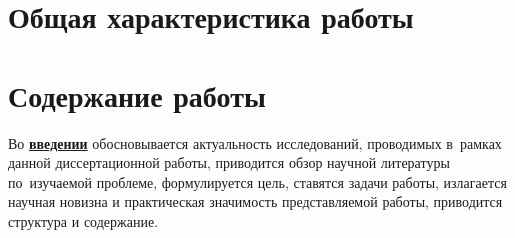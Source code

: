 \section*{Общая характеристика работы}

\newcommand{\actuality}{\pdfbookmark[1]{Актуальность}{actuality}\underline{\textbf{\actualityTXT}}}
\newcommand{\progress}{\pdfbookmark[1]{Разработанность темы}{progress}\underline{\textbf{\progressTXT}}}
\newcommand{\aim}{\pdfbookmark[1]{Цели}{aim}\underline{{\textbf\aimTXT}}}
\newcommand{\tasks}{\pdfbookmark[1]{Задачи}{tasks}\underline{\textbf{\tasksTXT}}}
\newcommand{\aimtasks}{\pdfbookmark[1]{Цели и задачи}{aimtasks}\aimtasksTXT}
\newcommand{\novelty}{\pdfbookmark[1]{Научная новизна}{novelty}\underline{\textbf{\noveltyTXT}}}
\newcommand{\influence}{\pdfbookmark[1]{Практическая значимость}{influence}\underline{\textbf{\influenceTXT}}}
\newcommand{\methods}{\pdfbookmark[1]{Методология и методы исследования}{methods}\underline{\textbf{\methodsTXT}}}
\newcommand{\defpositions}{\pdfbookmark[1]{Положения, выносимые на защиту}{defpositions}\underline{\textbf{\defpositionsTXT}}}
\newcommand{\reliability}{\pdfbookmark[1]{Достоверность}{reliability}\underline{\textbf{\reliabilityTXT}}}
\newcommand{\probation}{\pdfbookmark[1]{Апробация}{probation}\underline{\textbf{\probationTXT}}}
\newcommand{\contribution}{\pdfbookmark[1]{Личный вклад}{contribution}\underline{\textbf{\contributionTXT}}}
\newcommand{\publications}{\pdfbookmark[1]{Публикации}{publications}\underline{\textbf{\publicationsTXT}}}




\section*{Содержание работы}
Во \underline{\textbf{введении}} обосновывается актуальность
исследований, проводимых в~рамках данной диссертационной работы,
приводится обзор научной литературы по~изучаемой проблеме,
формулируется цель, ставятся задачи работы, излагается научная новизна
и практическая значимость представляемой работы, приводится структура и содержание.

